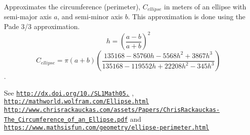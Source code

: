 Approximates the circumference (perimeter), $C_{ellipse}$ in meters of an ellipse with semi-\/major axis $a$, and semi-\/minor axis $b$. This approximation is done using the Pade 3/3 approximation. \[ h=\left( \frac{a-b}{a+b} \right)^2 \] \[ C_{ellipse}=\pi (a + b) \left( \frac{135168-85760 h-5568 h^2+ 3867 h^3}{135168-119552 h+ 22208 h^2 - 345h^3} \right) \]. 

See \href{http://dx.doi.org/10.3247/SL1Math05.004}{\tt http\+://dx.\+doi.\+org/10./\+S\+L1\+Math05.} , \href{http://mathworld.wolfram.com/Ellipse.html}{\tt http\+://mathworld.\+wolfram.\+com/\+Ellipse.\+html} \href{http://www.chrisrackauckas.com/assets/Papers/ChrisRackauckas-The_Circumference_of_an_Ellipse.pdf}{\tt http\+://www.\+chrisrackauckas.\+com/assets/\+Papers/\+Chris\+Rackauckas-\/\+The\+\_\+\+Circumference\+\_\+of\+\_\+an\+\_\+\+Ellipse.\+pdf} and \href{https://www.mathsisfun.com/geometry/ellipse-perimeter.html}{\tt https\+://www.\+mathsisfun.\+com/geometry/ellipse-\/perimeter.\+html}

